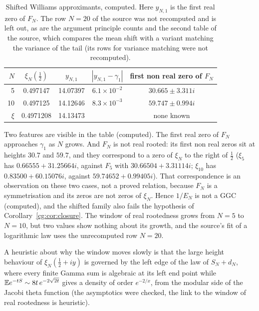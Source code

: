 \begin{table}[h]
\centering\small
\begin{tabular}{@{}rcccc@{}}
\toprule
$N$ & $\xi_N(\frac12)$ & $y_{N,1}$ & $|y_{N,1}-\gamma_1|$ & first non real zero of $F_N$\\
\midrule
5 & 0.497147 & 14.07397 & $6.1\times10^{-2}$ & $30.665\pm3.311i$\\
10 & 0.497125 & 14.12646 & $8.3\times10^{-3}$ & $59.747\pm0.994i$\\
\midrule
$\xi$ & 0.4971208 & 14.13473 & & none known\\
\bottomrule
\end{tabular}
\caption{Shifted Williams approximants, computed. Here $y_{N,1}$ is the first real zero of $F_N$. The row $N=20$ of the source was not recomputed and is left out, as are the argument principle counts and the second table of the source, which compares the mean shift with a variant matching the variance of the tail (its rows for variance matching were not recomputed).}\label{ht:tab:williams}
\end{table}

Two features are visible in the table (computed). The first real zero of $F_N$ approaches $\gamma_1$ as $N$ grows. And $F_N$ is not real rooted: its first non real zeros sit at heights $30.7$ and $59.7$, and they correspond to a zero of $\xi_N$ to the right of $\frac12$ ($\xi_5$ has $0.66555+31.25664i$, against $F_5$ with $30.66504+3.31114i$; $\xi_{10}$ has $0.83500+60.15076i$, against $59.74652+0.99405i$). That correspondence is an observation on these two cases, not a proved relation, because $F_N$ is a symmetrisation and its zeros are not zeros of $\xi_N$. Hence $1/E_N$ is not a GGC (computed), and the shifted family also fails the hypothesis of Corollary~\ref{cg:cor:closure}. The window of real rootedness grows from $N=5$ to $N=10$, but two values show nothing about its growth, and the source's fit of a logarithmic law uses the unrecomputed row $N=20$.

A heuristic about why the window moves slowly is that the large height behaviour of $\xi_N(\frac12+iy)$ is governed by the left edge of the law of $S_N+d_N$, where every finite Gamma sum is algebraic at its left end point while $\mathbb{E} e^{-tS}\sim8t\,e^{-2\sqrt{2t}}$ gives a density of order $e^{-2/x}$, from the modular side of the Jacobi theta function (the asymptotics were checked, the link to the window of real rootedness is heuristic).


